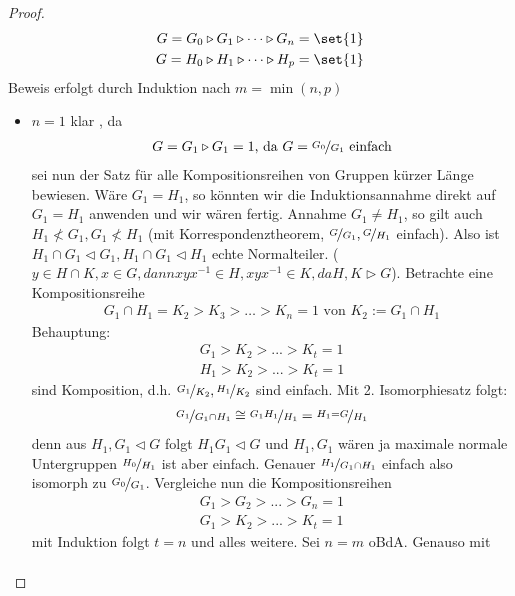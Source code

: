 \begin{proof}
	\begin{align*}
		G = G_0 \triangleright G_1 \triangleright \dots \triangleright G_n = \set{1}\\
		G = H_0 \triangleright H_1 \triangleright \dots \triangleright H_p = \set{1}
	\end{align*}
	Beweis erfolgt durch Induktion nach $m = \min(n,p)$\\
	\begin{itemize} %
		\item $n=1$ klar \checkmark, da
		\begin{align*}
			G = G_1 \rhd G_1 = 1\text{, da } G = \lnkset{G_0}{G_1} \text{ einfach}
		\end{align*}
		sei nun der Satz für alle Kompositionsreihen von Gruppen kürzer Länge bewiesen. Wäre $G_1 = H_1$, so könnten wir die Induktionsannahme direkt auf $G_1 = H_1$ anwenden und wir wären fertig. Annahme $G_1 \neq H_1$, so gilt auch $H_1 \not < G_1, G_1 \not < H_1$ (mit Korrespondenztheorem, $\lnkset{G}{G_1}, \lnkset{G}{H_1}$ einfach). Also ist $H_1 \cap G_1 \lhd G_1, H_1 \cap G_1 \lhd H_1$ echte Normalteiler. ($y \in H \cap K, x\in G, dann xyx^{-1} \in H,xyx^{-1} \in K, da H,K \rhd G$). Betrachte eine Kompositionsreihe
		\begin{align*}
			G_1 \cap H_1 = K_2 > K_3 > \dots > K_n = 1 \text{ von } K_2 := G_1 \cap H_1
		\end{align*}
		Behauptung:
		\begin{align*}
			G_1 > K_2 > ... > K_t = 1\\
			H_1 > K_2 > ... > K_t = 1
		\end{align*}
		sind Komposition, d.h. $\lnkset{G_1}{K_2},\lnkset{H_1}{K_2}$ sind einfach. Mit 2. Isomorphiesatz folgt:
		\begin{align*}
			\lnkset{G_1}{G_1 \cap H_1} \cong \lnkset{G_1 H_1}{H_1} = \lnkset{H_1=G}{H_1}
		\end{align*}
		denn aus $H_1,G_1 \lhd G$ folgt $H_1 G_1 \lhd G$ und $H_1,G_1$ wären ja maximale normale Untergruppen $\lnkset{H_0}{H_1}$ ist aber einfach. Genauer $\lnkset{H_1}{G_1\cap H_1}$ einfach also isomorph zu $\lnkset{G_0}{G_1}$. Vergleiche nun die Kompositionsreihen
		\begin{align*}
			G_1 > G_2 > ... > G_n = 1\\
			G_1 > K_2 > ... > K_t = 1
		\end{align*}
		mit Induktion folgt $t=n$ und alles weitere. Sei $n=m$ oBdA. Genauso mit
		\begin{align*}

\end{align*}
\end{itemize}
\end{proof}
